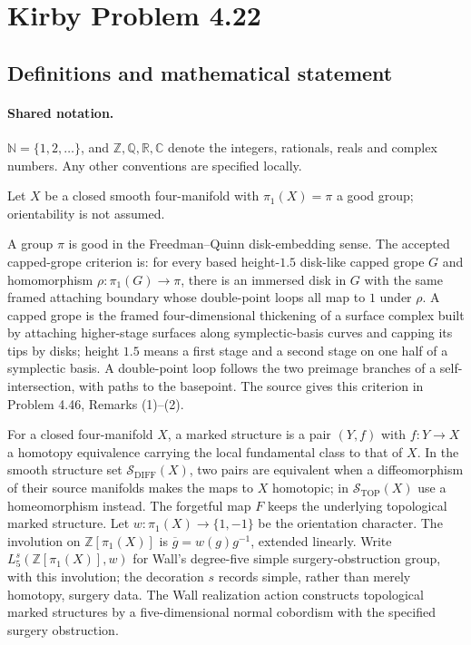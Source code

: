 \documentclass[11pt]{article}
\begin{document}
\section{Kirby Problem 4.22}\label{statement}

\subsection{Definitions and mathematical statement}

\paragraph{Shared notation.}$\mathbb N=\{1,2,\ldots\}$, and $\mathbb Z,\mathbb Q,\mathbb R,\mathbb C$ denote the integers, rationals, reals and complex numbers. Any other conventions are specified locally.


Let $X$ be a closed smooth four-manifold with $\pi_1(X)=\pi$ a good group; orientability is not assumed.

A group $\pi$ is good in the Freedman--Quinn disk-embedding sense. The accepted capped-grope criterion is: for every based height-$1.5$ disk-like capped grope $G$ and homomorphism $\rho:\pi_1(G)\to\pi$, there is an immersed disk in $G$ with the same framed attaching boundary whose double-point loops all map to $1$ under $\rho$. A capped grope is the framed four-dimensional thickening of a surface complex built by attaching higher-stage surfaces along symplectic-basis curves and capping its tips by disks; height $1.5$ means a first stage and a second stage on one half of a symplectic basis. A double-point loop follows the two preimage branches of a self-intersection, with paths to the basepoint. The source gives this criterion in Problem 4.46, Remarks (1)--(2).

For a closed four-manifold $X$, a marked structure is a pair $(Y,f)$ with $f:Y\to X$ a homotopy equivalence carrying the local fundamental class to that of $X$. In the smooth structure set $\mathcal S_{\mathrm{DIFF}}(X)$, two pairs are equivalent when a diffeomorphism of their source manifolds makes the maps to $X$ homotopic; in $\mathcal S_{\mathrm{TOP}}(X)$ use a homeomorphism instead. The forgetful map $F$ keeps the underlying topological marked structure. Let $w:\pi_1(X)\to\{1,-1\}$ be the orientation character. The involution on $\mathbb Z[\pi_1(X)]$ is $\overline g=w(g)g^{-1}$, extended linearly. Write $L_5^s(\mathbb Z[\pi_1(X)],w)$ for Wall's degree-five simple surgery-obstruction group, with this involution; the decoration $s$ records simple, rather than merely homotopy, surgery data. The Wall realization action constructs topological marked structures by a five-dimensional normal cobordism with the specified surgery obstruction.
\end{document}
